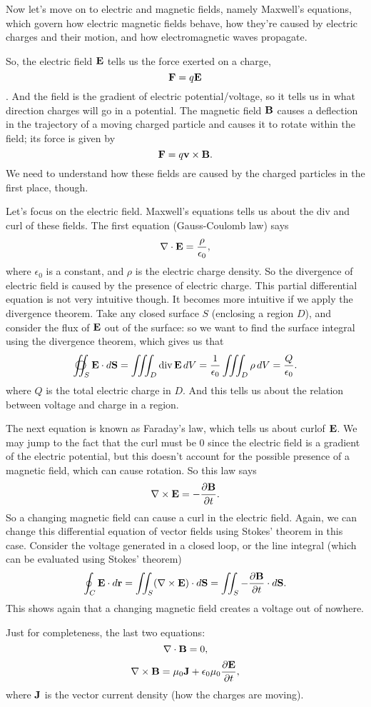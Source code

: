 Now let's move on to electric and magnetic fields, namely Maxwell's equations, which govern how electric magnetic fields behave, how they're caused by electric charges and their motion, and how electromagnetic waves propagate. 

So, the electric field $\boldsymbol{\mathbf{E}}$ tells us the force exerted on a charge,
\[ \boldsymbol{\mathbf{F}} = q\boldsymbol{\mathbf{E}}\]. 
And the field is the gradient of electric potential/voltage, so it tells us in what direction charges will go in a potential. The magnetic field $\boldsymbol{\mathbf{B}}$ causes a deflection in the trajectory of a moving charged particle and causes it to rotate within the field; its force is given by
\[ \boldsymbol{\mathbf{F}} = q\boldsymbol{\mathbf{v}} \times \boldsymbol{\mathbf{B}}. \]
We need to understand how these fields are caused by the charged particles in the first place, though.

Let's focus on the electric field. Maxwell's equations tells us about the div and curl of these fields. The first equation (Gauss-Coulomb law) says
\[ \nabla \cdot \boldsymbol{\mathbf{E}} = \frac \rho{\epsilon_0}, \]
where $\epsilon_0$ is a constant, and $\rho$ is the electric charge density. So the divergence of electric field is caused by the presence of electric charge. This partial differential equation is not very intuitive though. It becomes more intuitive if we apply the divergence theorem. Take any closed surface $S$ (enclosing a region $D$), and consider the flux of $\boldsymbol{\mathbf{E}}$ out of the surface: so we want to find the surface integral using the divergence theorem, which gives us that
\[ \oiint_S \vE \cdot \vdS = \iiint_D \divg \vE \,dV = \frac 1{\epsilon_0} \iiint_D \rho \,dV = \frac Q{\epsilon_0}.\]
where $Q$ is the total electric charge in $D$. And this tells us about the relation between voltage and charge in a region. 

The next equation is known as Faraday's law, which tells us about curlof $\boldsymbol{\mathbf{E}}$. We may jump to the fact that the curl must be 0 since the electric field is a gradient of the electric potential, but this doesn't account for the possible presence of a magnetic field, which can cause rotation. So this law says
\[ \nabla \times \boldsymbol{\mathbf{E}} = -\frac{\partial\boldsymbol{\mathbf{B}}}{\partial t}. \]
So a changing magnetic field can cause a curl in the electric field. Again, we can change this differential equation of vector fields using Stokes' theorem in this case. Consider the voltage generated in a closed loop, or the line integral (which can be evaluated using Stokes' theorem)
\[ \oint_C \boldsymbol{\mathbf{E}} \cdot d\boldsymbol{\mathbf{r}} = \iint_S (\nabla \times \boldsymbol{\mathbf{E}})\cdot d\boldsymbol{\mathbf{S}} = \iint_S -\frac{\partial\boldsymbol{\mathbf{B}}}{\partial t}\cdot d\boldsymbol{\mathbf{S}}. \]
This shows again that a changing magnetic field creates a voltage out of nowhere.

Just for completeness, the last two equations:
\[ \nabla \cdot \boldsymbol{\mathbf{B}} = 0, \]
\[ \nabla \times \boldsymbol{\mathbf{B}} = \mu_0 \boldsymbol{\mathbf{J}} + \epsilon_0 \mu_0 \frac{\partial\boldsymbol{\mathbf{E}}}{\partial t}, \]
where $\boldsymbol{\mathbf{J}}$ is the vector current density (how the charges are moving).